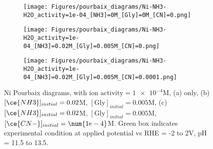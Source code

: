 \begin{figure}[htbp]
    \centering
    \begin{subfigure}[b]{0.3\textwidth}
        \subcaption{}\label{fig:Ni_Pourbaix_H2O}
        \texttt{[image: Figures/pourbaix\_diagrams/Ni-NH3-H2O\_activity=1e-04\_[NH3]=0M\_[Gly]=0M\_[CN]=0.png]}
        \par\medskip
    \end{subfigure}
    \begin{subfigure}[b]{0.3\textwidth}
        \subcaption{}\label{fig:Ni_Pourbaix_NH3_Gly}
        \texttt{[image: Figures/pourbaix\_diagrams/Ni-NH3-H2O\_activity=1e-04\_[NH3]=0.02M\_[Gly]=0.005M\_[CN]=0.png]}
        \par\medskip
    \end{subfigure}
    \begin{subfigure}[b]{0.3\textwidth}
        \subcaption{}\label{fig:Ni_Pourbaix_NH3_Gly_CN}
        \texttt{[image: Figures/pourbaix\_diagrams/Ni-NH3-H2O\_activity=1e-04\_[NH3]=0.02M\_[Gly]=0.005M\_[CN]=0.0001.png]}
        \par\medskip   
    \end{subfigure}
    \caption{Ni Pourbaix diagrams, with $\text{ion activity}=\num{1e-4}$M, (a) only, (b)$[\ce{NH3}]_{initial}= 0.02$M, $[\text{Gly}]_{initial}=0.005$M, (c)$[\ce{NH3}]_{initial}= 0.02$M, $[\text{Gly}]_{initial}=0.005$M,  $[\ce{CN-}]_{initial}=\num{1e-4}$M. Green box indicates experimental condition at applied potential vs RHE = -2 to 2V, pH = 11.5 to 13.5.}
    \label{fig:Ni_Pourbaix}
\end{figure}
